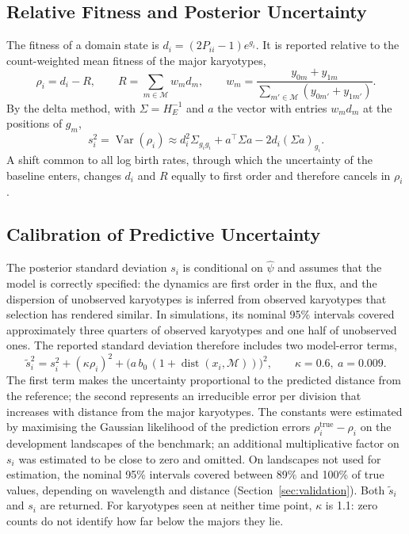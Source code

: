 \documentclass[11pt]{article}
\begin{document}
\subsection{Relative Fitness and Posterior Uncertainty}
\label{sec:sj-relative}

The fitness of a domain state is $d_i=(2P_{ii}-1)e^{g_i}$. It is reported
relative to the count-weighted mean fitness of the major karyotypes,
\begin{equation}
  \rho_i=d_i-R,\qquad R=\sum_{m\in\mathcal{M}}w_md_m,\qquad
  w_m=\frac{y_{0m}+y_{1m}}{\sum_{m'\in\mathcal{M}}(y_{0m'}+y_{1m'})}.
  \label{eq:relative}
\end{equation}
By the delta method, with $\Sigma=H_E^{-1}$ and $a$ the vector with entries
$w_md_m$ at the positions of $g_m$,
\begin{equation}
  s_i^2=\operatorname{Var}(\rho_i)\approx d_i^2\Sigma_{g_ig_i}+a^\top\Sigma a-2d_i(\Sigma a)_{g_i}.
  \label{eq:relative-var}
\end{equation}
A shift common to all log birth rates, through which the uncertainty of the
baseline enters, changes $d_i$ and $R$ equally to first order and therefore
cancels in $\rho_i$.

\subsection{Calibration of Predictive Uncertainty}
\label{sec:sj-calibration}

The posterior standard deviation $s_i$ is conditional on $\hat\psi$ and
assumes that the model is correctly specified: the dynamics are first order in
the flux, and the dispersion of unobserved karyotypes is inferred from
observed karyotypes that selection has rendered similar. In simulations, its
nominal 95\% intervals covered approximately three quarters of observed
karyotypes and one half of unobserved ones. The reported standard deviation
therefore includes two model-error terms,
\begin{equation}
  \tilde s_i^2=s_i^2+(\kappa\rho_i)^2+\bigl(a\,b_0\,(1+\operatorname{dist}(x_i,\mathcal{M}))\bigr)^2,
  \qquad \kappa=0.6,\ a=0.009.
  \label{eq:calibration}
\end{equation}
The first term makes the uncertainty proportional to the predicted distance
from the reference; the second represents an irreducible error per division
that increases with distance from the major karyotypes. The constants were
estimated by maximising the Gaussian likelihood of the prediction errors
$\rho_i^{\mathrm{true}}-\rho_i$ on the development landscapes of the
benchmark; an additional multiplicative factor on $s_i$ was estimated to be
close to zero and omitted. On landscapes not used for estimation, the nominal
95\% intervals covered between 89\% and 100\% of true values, depending on
wavelength and distance (Section~\ref{sec:validation}). Both $\tilde s_i$ and
$s_i$ are returned. For karyotypes seen at neither time point, $\kappa$ is 1.1:
zero counts do not identify how far below the majors they lie.
\end{document}
